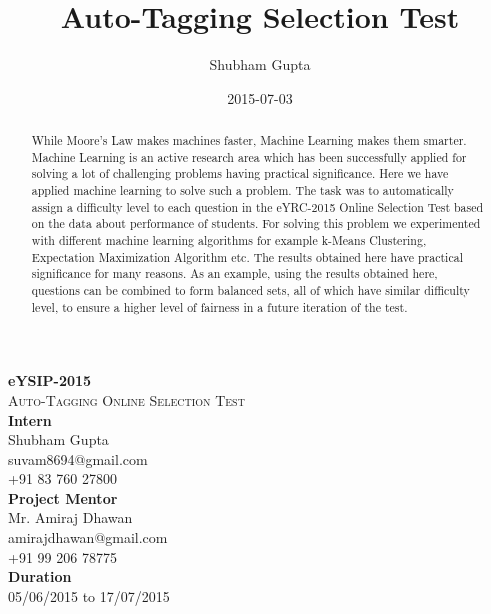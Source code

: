 \documentclass[12pt]{article}
\title{Auto-Tagging Selection Test}
\date{2015-07-03}
\author{Shubham Gupta}
\begin{document}
	\begin{titlepage}
		\begin{center}
			\vspace*{20mm}
			\LARGE
			\textbf{eYSIP-2015}\\
			\vspace{15mm}
			\Huge\textsc{Auto-Tagging Online Selection Test}\\
			\vfill
			\Large
			\textbf{Intern}\\
			Shubham Gupta\\
			suvam8694@gmail.com\\
			+91 83 760 27800\\
			\vspace{10mm}
			\textbf{Project Mentor}\\
			Mr. Amiraj Dhawan\\
			amirajdhawan@gmail.com\\
			+91 99 206 78775\\
			\vspace{10mm}
			\textbf{Duration}\\
			05/06/2015 to 17/07/2015
			\vspace{20mm}
		\end{center}
	\end{titlepage}
	
	
	\tableofcontents
	
	
	
	\newpage
	\begin{abstract}
		While Moore's Law makes machines faster, Machine Learning
		makes them smarter. Machine Learning is an active research
		area which has been successfully applied for solving a lot of
		challenging problems having practical significance. Here we
		have applied machine learning to solve such a problem. The task
		was to automatically assign a difficulty level to each question
		in the eYRC-2015 Online Selection Test based on the data about
		performance of students. For solving this problem we experimented
		with different machine learning algorithms for example k-Means
		Clustering, Expectation Maximization Algorithm etc.\newline
		The results obtained here have practical significance for many
		reasons. As an example, using the results obtained here, questions
		can be combined to form balanced sets, all of which have similar
		difficulty level, to ensure a higher level of fairness in a future
		iteration of the test.
	\end{abstract}
	
\end{document}
